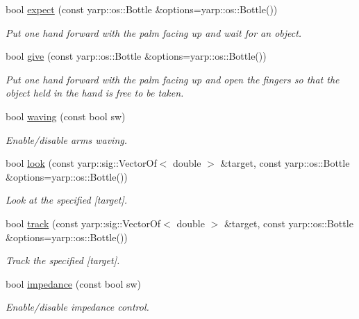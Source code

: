 \begin{DoxyCompactItemize}
bool \hyperlink{group__icubclient__subsystems_adab52bf105b04e4e40ab2ce216350648}{expect} (const yarp\+::os\+::\+Bottle \&options=yarp\+::os\+::\+Bottle())
\begin{DoxyCompactList}\small\item\em Put one hand forward with the palm facing up and wait for an object. \end{DoxyCompactList}\item 
bool \hyperlink{group__icubclient__subsystems_aca9d66bebcb9a4c81b8523e45a39f693}{give} (const yarp\+::os\+::\+Bottle \&options=yarp\+::os\+::\+Bottle())
\begin{DoxyCompactList}\small\item\em Put one hand forward with the palm facing up and open the fingers so that the object held in the hand is free to be taken. \end{DoxyCompactList}\item 
bool \hyperlink{group__icubclient__subsystems_a12374067510db0ffcd01bbea4e7b0ce1}{waving} (const bool sw)
\begin{DoxyCompactList}\small\item\em Enable/disable arms waving. \end{DoxyCompactList}\item 
bool \hyperlink{group__icubclient__subsystems_a1063ea28c120fe11f3f42b92f1ac84ea}{look} (const yarp\+::sig\+::\+Vector\+Of$<$ double $>$ \&target, const yarp\+::os\+::\+Bottle \&options=yarp\+::os\+::\+Bottle())
\begin{DoxyCompactList}\small\item\em Look at the specified \mbox{[}target\mbox{]}. \end{DoxyCompactList}\item 
bool \hyperlink{group__icubclient__subsystems_adb9f502a08ee0aeb1c22b10b37def763}{track} (const yarp\+::sig\+::\+Vector\+Of$<$ double $>$ \&target, const yarp\+::os\+::\+Bottle \&options=yarp\+::os\+::\+Bottle())
\begin{DoxyCompactList}\small\item\em Track the specified \mbox{[}target\mbox{]}. \end{DoxyCompactList}\item 
bool \hyperlink{group__icubclient__subsystems_a3d47ce46a6a31949ad9da3faf1a0ca9f}{impedance} (const bool sw)
\begin{DoxyCompactList}\small\item\em Enable/disable impedance control. \end{DoxyCompactList}\item 

\end{DoxyCompactItemize}
